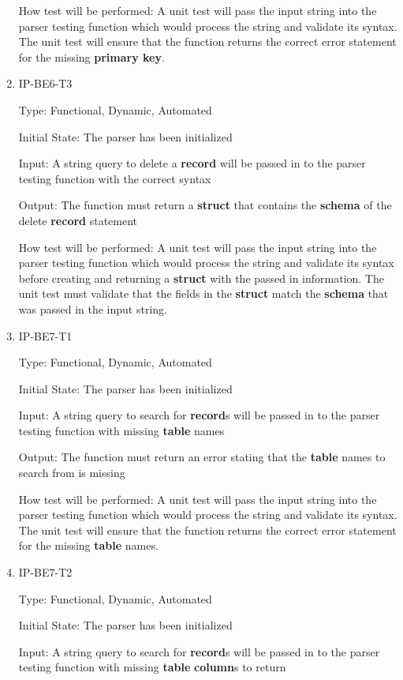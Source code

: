 \documentclass[12pt, titlepage]{article}
\begin{document}
\begin{enumerate}
How test will be performed: A unit test will pass the input string into the parser testing function which would process the string and validate its syntax. The unit test will ensure that the function returns the correct error statement for the missing \textbf{primary key}.

\item{IP-BE6-T3}

Type: Functional, Dynamic, Automated
					
Initial State: The parser has been initialized
					
Input: A string query to delete a \textbf{record} will be passed in to the parser testing function with the correct syntax
					
Output: The function must return a \textbf{struct} that contains the \textbf{schema} of the delete \textbf{record} statement
					
How test will be performed: A unit test will pass the input string into the parser testing function which would process the string and validate its syntax before creating and returning a \textbf{struct} with the passed in information. The unit test must validate that the fields in the \textbf{struct} match the \textbf{schema} that was passed in the input string.

\item{IP-BE7-T1}

Type: Functional, Dynamic, Automated
					
Initial State: The parser has been initialized
					
Input: A string query to search for \textbf{record}s will be passed in to the parser testing function with missing \textbf{table} names
					
Output: The function must return an error stating that the \textbf{table} names to search from is missing
					
How test will be performed: A unit test will pass the input string into the parser testing function which would process the string and validate its syntax. The unit test will ensure that the function returns the correct error statement for the missing \textbf{table} names.

\item{IP-BE7-T2}

Type: Functional, Dynamic, Automated
					
Initial State: The parser has been initialized
					
Input: A string query to search for \textbf{record}s will be passed in to the parser testing function with missing \textbf{table} \textbf{column}s to return
					

\end{enumerate}
\end{document}
